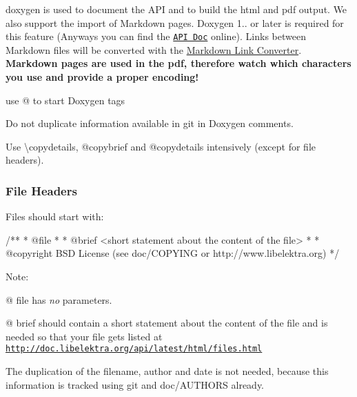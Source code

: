 {\ttfamily doxygen} is used to document the A\+P\+I and to build the html and pdf output. We also support the import of Markdown pages. Doxygen 1.. or later is required for this feature (Anyways you can find the \href{http://doc.libelektra.org/api/latest/html/}{\tt A\+P\+I Doc} online). Links between Markdown files will be converted with the \hyperlink{doc_markdownlinkconverter_README_md}{Markdown Link Converter}. {\bfseries Markdown pages are used in the pdf, therefore watch which characters you use and provide a proper encoding!}


\begin{DoxyItemize}
\item use {\ttfamily @} to start Doxygen tags
\item Do not duplicate information available in git in Doxygen comments.
\item Use {\ttfamily \textbackslash{}copydetails}, {\ttfamily @copybrief} and {\ttfamily @copydetails} intensively (except for file headers).
\end{DoxyItemize}

\subsubsection*{File Headers}

Files should start with\+:

\begin{DoxyVerb}        /**
         * @file
         *
         * @brief <short statement about the content of the file>
         *
         * @copyright BSD License (see doc/COPYING or http://www.libelektra.org)
         */\end{DoxyVerb}


Note\+:


\begin{DoxyItemize}
\item {\ttfamily @} {\ttfamily file} has {\itshape no} parameters.
\item {\ttfamily @} {\ttfamily brief} should contain a short statement about the content of the file and is needed so that your file gets listed at \href{http://doc.libelektra.org/api/latest/html/files.html}{\tt http\+://doc.\+libelektra.\+org/api/latest/html/files.\+html}
\end{DoxyItemize}

The duplication of the filename, author and date is not needed, because this information is tracked using git and doc/\+A\+U\+T\+H\+O\+R\+S already. 